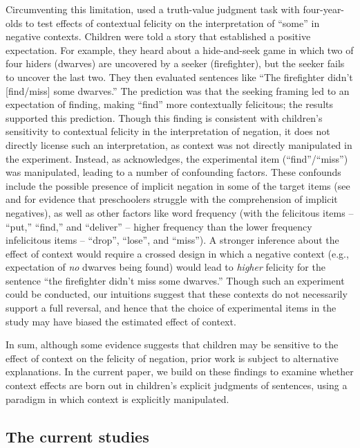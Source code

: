 \documentclass[man, noapacite]{apa2}
\begin{document}
Circumventing this limitation,  used a truth-value judgment task with four-year-olds to test effects of contextual felicity on the interpretation of ``some'' in negative contexts. Children were told a story that established a positive expectation. For example, they heard about a hide-and-seek game in which two of four hiders (dwarves) are uncovered by a seeker (firefighter), but the seeker fails to uncover the last two. They then evaluated sentences like ``The firefighter didn't [find/miss] some dwarves.'' The prediction was that the seeking framing led to an expectation of finding, making ``find'' more contextually felicitous; the results supported this prediction. Though this finding is consistent with children's sensitivity to contextual felicity in the interpretation of negation, it does not directly license such an interpretation, as context was not directly manipulated in the experiment. Instead, as  acknowledges, the experimental item (``find''/``miss'') was manipulated, leading to a number of confounding factors. These confounds include the possible presence of implicit negation in some of the target items (see  and  for evidence that preschoolers struggle with the comprehension of implicit negatives), as well as other factors like word frequency (with the felicitous items -- ``put,'' ``find,'' and ``deliver'' -- higher frequency than the lower frequency infelicitous items -- ``drop'', ``lose'', and ``miss''). A stronger inference about the effect of context would require a crossed design in which a negative context (e.g., expectation of \emph{no} dwarves being found) would lead to \emph{higher} felicity for the sentence ``the firefighter didn't miss some dwarves.'' Though such an experiment could be conducted, our intuitions suggest that these contexts do not necessarily support a full reversal, and hence that the choice of experimental items in the study may have biased the estimated effect of context.

In sum, although some evidence suggests that children may be sensitive to the effect of context on the felicity of negation, prior work is subject to alternative explanations. In the current paper, we build on these findings to examine whether context effects are born out in children's explicit judgments of sentences, using a paradigm in which context is explicitly manipulated.

\subsection{The current studies}
\end{document}
